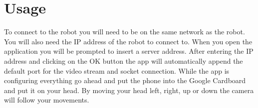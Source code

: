 \section{Usage}
To connect to the robot you will need to be on the same network as the robot. You will also need the IP address of the robot to connect to. When you open the application you will be prompted to insert a server address. After entering the IP address and clicking on the OK button the app will automatically append the default port for the video stream and socket connection.\newline
\newline
While the app is configuring everything go ahead and put the phone into the Google Cardboard and put it on your head. By moving your head left, right, up or down the camera will follow your movements.
